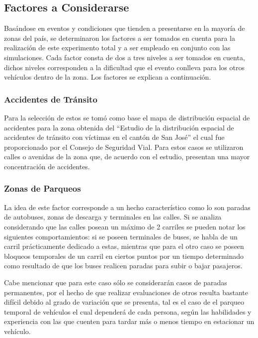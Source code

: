\documentclass[12pt,journal,compsoc]{IEEEtran}
\begin{document}
\subsection{Factores a Considerarse}
Bas\'{a}ndose en eventos y condiciones que tienden a presentarse en la mayor\'{i}a de zonas del pa\'{i}s, se determinaron los factores a ser tomados en cuenta para la realizaci\'{o}n de este experimento total y a ser empleado en conjunto con las simulaciones. Cada factor consta de dos a tres niveles a ser tomados en cuenta, dichos niveles corresponden a la dificultad que el evento conlleva para los otros veh\'{i}culos dentro de la zona. Los factores se explican a continuaci\'{o}n.

\subsubsection{Accidentes de Tr\'{a}nsito}
Para la selecci\'{o}n de estos se tom\'{o} como base el mapa de distribuci\'{o}n espacial de accidentes para la zona obtenida del “Estudio de la distribuci\'{o}n espacial de accidentes de tr\'{a}nsito con v\'{i}ctimas en el cant\'{o}n de San Jos\'{e}” el cual fue proporcionado por el Consejo de Seguridad Vial. Para estos casos se utilizaron calles o avenidas de la zona que, de acuerdo con el estudio, presentan una mayor concentraci\'{o}n de accidentes.

\subsubsection{Zonas de Parqueos}
La idea de este  factor corresponde a un hecho caracter\'{i}stico como lo son paradas de autobuses, zonas de descarga y terminales en las calles. Si se analiza considerando que las calles posean un m\'{a}ximo de 2 carriles se pueden notar los siguientes comportamientos: si se poseen terminales de buses, se habla de un carril pr\'{a}cticamente dedicado a estas, mientras que para el otro caso se poseen bloqueos temporales de un carril en ciertos puntos por un tiempo determinado como resultado de que los buses realicen paradas para subir o bajar pasajeros. 

	Cabe mencionar que para este caso s\'{o}lo se considerar\'{a}n casos de paradas permanentes, por el hecho de que realizar evaluaciones de otros resulta bastante difícil debido al grado de variación que se presenta, tal es el caso de el parqueo temporal de vehículos el cual dependerá de cada persona, según las habilidades y experiencia con las que cuenten para tardar más o menos tiempo en estacionar un vehículo.
\end{document}
